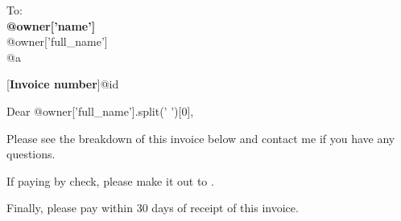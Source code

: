 \documentclass[paper=a4,fontsize=11pt,DIV=12]{scrlttr2}
\begin{document}
    \begin{letter}{To:\\
			\textbf{@{owner['name']}}\\
			@{owner['full_name']}\\
@{a}\\
		}
		
		
		[\textbf{Invoice number}]{@{id}}
		
		\opening{Dear @{owner['full_name'].split(' ')[0]},}
		
        Please see the breakdown of this invoice below and contact me if you have any questions. 
        
        If paying by check, please make it out to .
        
        Finally, please pay within 30 days of receipt of this invoice.




{}
{  }



\renewcommand{\arraystretch}{1.4}


\end{letter}
\end{document}

